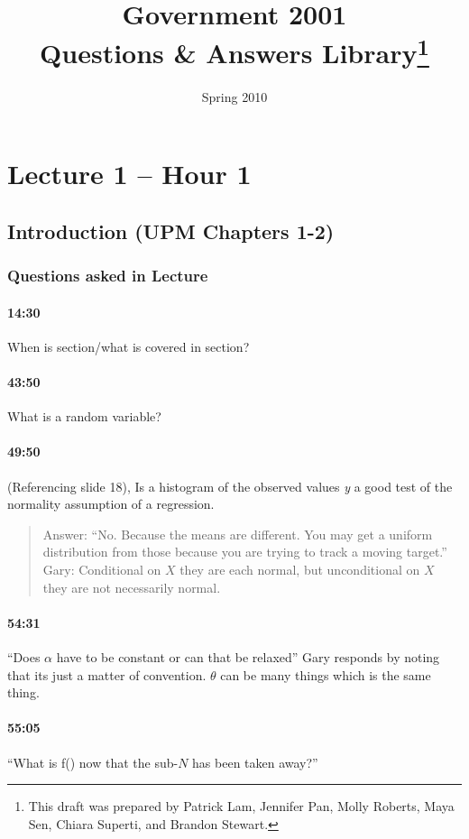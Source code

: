 \documentclass[11pt]{article}
\title{Government 2001\\
Questions \& Answers Library\footnote{This draft was prepared by Patrick Lam, Jennifer Pan, Molly Roberts, Maya Sen, Chiara Superti, and Brandon Stewart.}}
\date{Spring 2010}
\begin{document}
\maketitle

\tableofcontents

\pagebreak

\section{Lecture 1 -- Hour 1}

\subsection{Introduction (UPM Chapters 1-2)}

\subsubsection{Questions asked in Lecture}

\paragraph{14:30} When is section/what is covered in section? 
\paragraph{43:50} What is a random variable?
\paragraph{49:50} (Referencing slide 18), Is a histogram of the observed values \textit{y} a good test of the normality assumption of a regression.  
\begin{quote}
Answer: ``No. Because the means are different.  You may get a uniform distribution from those because you are trying to track a moving target.'' \\
Gary: Conditional on $X$ they are each normal, but unconditional on $X$ they are not necessarily normal.
\end{quote}
\paragraph{54:31} ``Does $\alpha$ have to be constant or can that be relaxed'' Gary responds by noting that its just a matter of convention.  $\theta$ can be many things which is the same thing.
\paragraph{55:05} ``What is f() now that the sub-$N$ has been taken away?''
\end{document}
